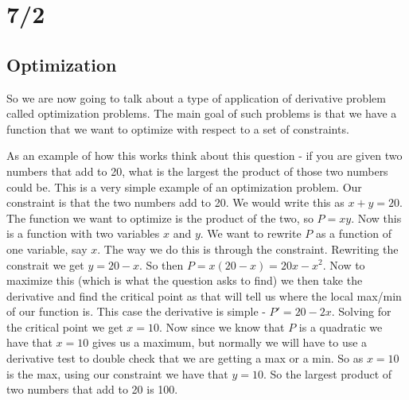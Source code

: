 \documentclass[12pt,reqno]{article}
\theoremstyle{definition}
\begin{document}
\section{7/2}

\subsection{Optimization}

So we are now going to talk about a type of application of derivative problem called optimization problems. The main goal of such problems is that we have a function that we want to optimize with respect to a set of constraints. 

As an example of how this works think about this question - if you are given two numbers that add to 20, what is the largest the product of those two numbers could be. This is a very simple example of an optimization problem. Our constraint is that the two numbers add to 20. We would write this as $x + y = 20$. The function we want to optimize is the product of the two, so $P = xy$. Now this is a function with two variables $x$ and $y$. We want to rewrite $P$ as a function of one variable, say $x$. The way we do this is through the constraint. Rewriting the constrait we get $y = 20 - x$. So then $P = x(20 - x) = 20x - x^2$. Now to maximize this (which is what the question asks to find) we then take the derivative and find the critical point as that will tell us where the local max/min of our function is. This case the derivative is simple - $P' = 20 - 2x$. Solving for the critical point we get $x = 10$. Now since we know that $P$ is a quadratic we have that $x = 10$ gives us a maximum, but normally we will have to use a derivative test to double check that we are getting a max or a min. So as $x = 10$ is the max, using our constraint we have that $y = 10$. So the largest product of two numbers that add to 20 is 100. 
\end{document}
